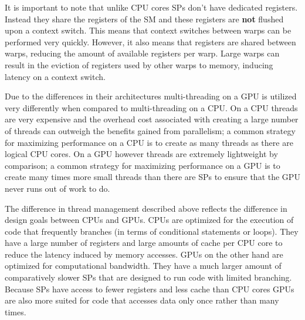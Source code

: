 It is important to note that unlike CPU cores SPs don't have dedicated registers.
Instead they share the registers of the SM and these registers are \textbf{not} flushed upon a context switch.
This means that context switches between warps can be performed very quickly.
However, it also means that registers are shared between warps, reducing the amount of available registers per warp.
Large warps can result in the eviction of registers used by other warps to memory, inducing latency on a context switch.

Due to the differences in their architectures multi-threading on a GPU
is utilized very differently when compared to multi-threading on a CPU.
On a CPU threads are very expensive and the overhead cost associated with
creating a large number of threads can outweigh the benefits gained from parallelism;
a common strategy for maximizing performance on a CPU is to create as many threads as there are logical CPU cores.
On a GPU however threads are extremely lightweight by comparison;
a common strategy for maximizing performance on a GPU is to create
many times more small threads than there are SPs to ensure that the GPU never runs out of work to do.

The difference in thread management described above reflects the difference in design goals between CPUs and GPUs.
CPUs are optimized for the execution of code that frequently branches (in terms of conditional statements or loops).
They have a large number of registers and large amounts of cache per CPU core to reduce the latency induced by memory accesses.
GPUs on the other hand are optimized for computational bandwidth.
They have a much larger amount of comparatively slower SPs that are designed to run code with limited branching.
Because SPs have access to fewer registers and less cache than CPU cores GPUs are also more suited for code that
accesses data only once rather than many times.
